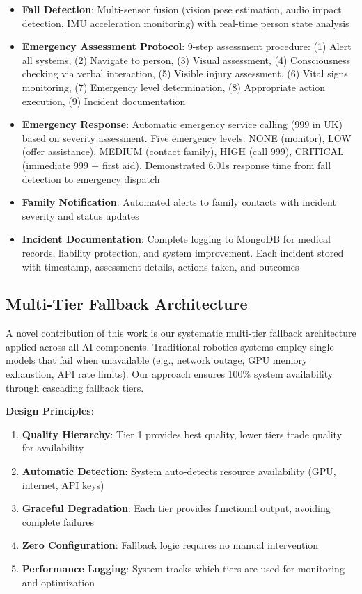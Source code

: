 \documentclass[conference]{IEEEtran}
\begin{document}
\begin{itemize}
    \item \textbf{Fall Detection}: Multi-sensor fusion (vision pose estimation, audio impact detection, IMU acceleration monitoring) with real-time person state analysis
    
    \item \textbf{Emergency Assessment Protocol}: 9-step assessment procedure: (1) Alert all systems, (2) Navigate to person, (3) Visual assessment, (4) Consciousness checking via verbal interaction, (5) Visible injury assessment, (6) Vital signs monitoring, (7) Emergency level determination, (8) Appropriate action execution, (9) Incident documentation
    
    \item \textbf{Emergency Response}: Automatic emergency service calling (999 in UK) based on severity assessment. Five emergency levels: NONE (monitor), LOW (offer assistance), MEDIUM (contact family), HIGH (call 999), CRITICAL (immediate 999 + first aid). Demonstrated 6.01s response time from fall detection to emergency dispatch
    
    \item \textbf{Family Notification}: Automated alerts to family contacts with incident severity and status updates
    
    \item \textbf{Incident Documentation}: Complete logging to MongoDB for medical records, liability protection, and system improvement. Each incident stored with timestamp, assessment details, actions taken, and outcomes
\end{itemize}

\subsection{Multi-Tier Fallback Architecture}

A novel contribution of this work is our systematic multi-tier fallback architecture applied across all AI components. Traditional robotics systems employ single models that fail when unavailable (e.g., network outage, GPU memory exhaustion, API rate limits). Our approach ensures 100\% system availability through cascading fallback tiers.

\textbf{Design Principles}:
\begin{enumerate}
    \item \textbf{Quality Hierarchy}: Tier 1 provides best quality, lower tiers trade quality for availability
    \item \textbf{Automatic Detection}: System auto-detects resource availability (GPU, internet, API keys)
    \item \textbf{Graceful Degradation}: Each tier provides functional output, avoiding complete failures
    \item \textbf{Zero Configuration}: Fallback logic requires no manual intervention
    \item \textbf{Performance Logging}: System tracks which tiers are used for monitoring and optimization
\end{enumerate}
\end{document}
